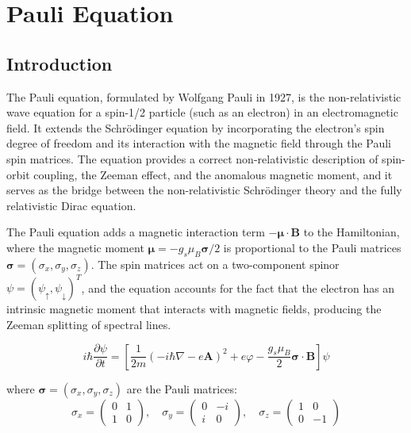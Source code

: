 \chapter{Pauli Equation}

\section*{Introduction}

The Pauli equation, formulated by Wolfgang Pauli in 1927, is the non-relativistic wave equation for a spin-1/2 particle (such as an electron) in an electromagnetic field. It extends the Schrödinger equation by incorporating the electron's spin degree of freedom and its interaction with the magnetic field through the Pauli spin matrices. The equation provides a correct non-relativistic description of spin-orbit coupling, the Zeeman effect, and the anomalous magnetic moment, and it serves as the bridge between the non-relativistic Schrödinger theory and the fully relativistic Dirac equation.

The Pauli equation adds a magnetic interaction term $-\boldsymbol{\mu}\cdot\mathbf{B}$ to the Hamiltonian, where the magnetic moment $\boldsymbol{\mu} = -g_{s}\mu_{B}\boldsymbol{\sigma}/2$ is proportional to the Pauli matrices $\boldsymbol{\sigma} = (\sigma_{x}, \sigma_{y}, \sigma_{z})$. The spin matrices act on a two-component spinor $\psi = (\psi_{\uparrow}, \psi_{\downarrow})^{T}$, and the equation accounts for the fact that the electron has an intrinsic magnetic moment that interacts with magnetic fields, producing the Zeeman splitting of spectral lines.


\begin{equation}
\boxed{\; i\hbar\frac{\partial\psi}{\partial t} = \left[\frac{1}{2m}\left(-i\hbar\nabla - e\mathbf{A}\right)^{2} + e\varphi - \frac{g_{s}\mu_{B}}{2}\boldsymbol{\sigma}\cdot\mathbf{B}\right]\psi\;}
\label{eq:pauli}
\end{equation}

where $\boldsymbol{\sigma} = (\sigma_{x}, \sigma_{y}, \sigma_{z})$ are the Pauli matrices:
\begin{equation}
\sigma_{x} = \begin{pmatrix}0&1\\1&0\end{pmatrix}, \quad
\sigma_{y} = \begin{pmatrix}0&-i\\i&0\end{pmatrix}, \quad
\sigma_{z} = \begin{pmatrix}1&0\\0&-1\end{pmatrix}
\label{eq:pauli-matrices}
\end{equation}

